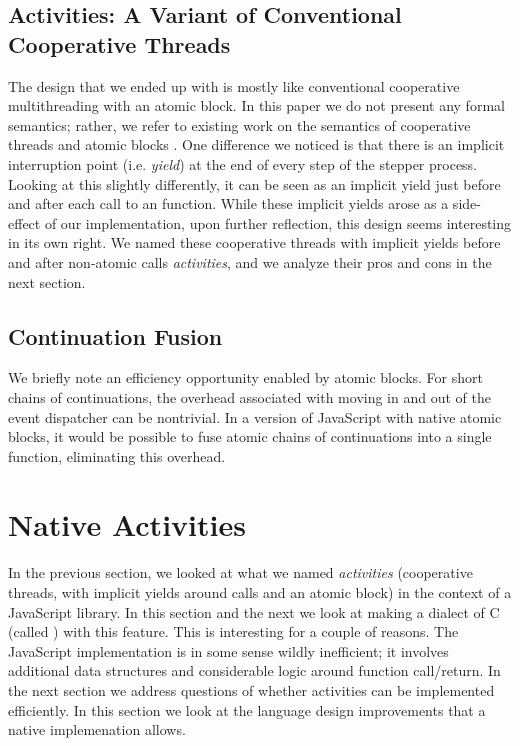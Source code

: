\documentclass[acmsmall,anonymous,review]{acmart}\settopmatter{printfolios=true,printccs=false,printacmref=false}
\begin{document}
\subsection{Activities: A Variant of Conventional Cooperative Threads}

The design that we ended up with is mostly like conventional cooperative multithreading with an atomic block.
In this paper we do not present any formal semantics; rather, we refer to existing work on the semantics of cooperative threads \cite{Abadi2009} and atomic blocks \cite{Moore2008}.
One difference we noticed is that there is an implicit interruption point (i.e. \emph{yield}) at the end of every step of the stepper process.
Looking at this slightly differently, it can be seen as an implicit yield just before and after each call to an \asyncs{} function.
While these implicit yields arose as a side-effect of our implementation, upon further reflection, this design seems interesting in its own right.
We named these cooperative threads with implicit yields before and after non-atomic calls \emph{activities}, and we analyze their pros and cons in the next section.

\subsection{Continuation Fusion}

We briefly note an efficiency opportunity enabled by atomic blocks.
For short chains of continuations, the overhead associated with moving in and out of the event dispatcher can be nontrivial.
In a version of JavaScript with native atomic blocks, it would be possible to fuse atomic chains of continuations into a single function, eliminating this overhead.


\section{Native Activities}

In the previous section, we looked at what we named \emph{activities} (cooperative threads, with implicit yields around calls and an atomic block) in the context of a JavaScript library.
In this section and the next we look at making a dialect of C (called \charcoal{}) with this feature.
This is interesting for a couple of reasons.
The JavaScript implementation is in some sense wildly inefficient; it involves additional data structures and considerable logic around \asyncs{} function call/return.
In the next section we address questions of whether activities can be implemented efficiently.
In this section we look at the language design improvements that a native implemenation allows.
\end{document}
